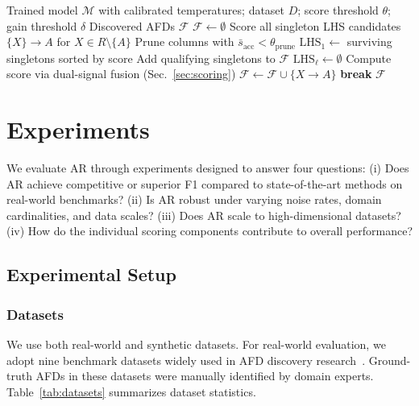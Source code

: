 \documentclass[conference]{IEEEtran}
\begin{document}
\begin{algorithm}[t]
\caption{AR: AFD Discovery via Any-Order Conditional Transformer}
\label{alg:ar}
\begin{algorithmic}[1]
\REQUIRE Trained model $\mathcal{M}$ with calibrated temperatures; dataset $D$; score threshold $\theta$; gain threshold $\delta$
\ENSURE Discovered AFDs $\mathcal{F}$
\STATE $\mathcal{F} \leftarrow \emptyset$
    \STATE Score all singleton LHS candidates $\{X\} \to A$ for $X \in R \setminus \{A\}$
    \STATE Prune columns with $\bar{s}_{\text{acc}} < \theta_{\text{prune}}$ 
    \STATE $\text{LHS}_1 \leftarrow$ surviving singletons sorted by score
    \STATE Add qualifying singletons to $\mathcal{F}$ 
        \STATE $\text{LHS}_{\ell} \leftarrow \emptyset$
                \STATE Compute score via dual-signal fusion (Sec.~\ref{sec:scoring})
                    \STATE $\mathcal{F} \leftarrow \mathcal{F} \cup \{X \to A\}$
                \ENDIF
            \ENDIF
        \ENDFOR
         \textbf{break} \ENDIF
    \ENDFOR
\ENDFOR
\RETURN $\mathcal{F}$
\end{algorithmic}
\end{algorithm}

\section{Experiments}\label{sec:exp}

We evaluate AR through experiments designed to answer four questions: (i) Does AR achieve competitive or superior F1 compared to state-of-the-art methods on real-world benchmarks? (ii) Is AR robust under varying noise rates, domain cardinalities, and data scales? (iii) Does AR scale to high-dimensional datasets? (iv) How do the individual scoring components contribute to overall performance?

\subsection{Experimental Setup}

\subsubsection{Datasets}
We use both real-world and synthetic datasets. For real-world evaluation, we adopt nine benchmark datasets widely used in AFD discovery research~\cite{cafdui,afdminer}. Ground-truth AFDs in these datasets were manually identified by domain experts. Table~\ref{tab:datasets} summarizes dataset statistics.
\end{document}

